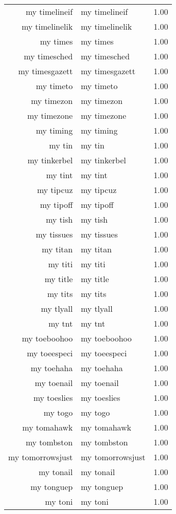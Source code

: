 \begin{table}[ht]
\begin{tabular}{rlr}
  my timelineif & my timelineif & 1.00 \\ 
  my timelinelik & my timelinelik & 1.00 \\ 
  my times & my times & 1.00 \\ 
  my timesched & my timesched & 1.00 \\ 
  my timesgazett & my timesgazett & 1.00 \\ 
  my timeto & my timeto & 1.00 \\ 
  my timezon & my timezon & 1.00 \\ 
  my timezone & my timezone & 1.00 \\ 
  my timing & my timing & 1.00 \\ 
  my tin & my tin & 1.00 \\ 
  my tinkerbel & my tinkerbel & 1.00 \\ 
  my tint & my tint & 1.00 \\ 
  my tipcuz & my tipcuz & 1.00 \\ 
  my tipoff & my tipoff & 1.00 \\ 
  my tish & my tish & 1.00 \\ 
  my tissues & my tissues & 1.00 \\ 
  my titan & my titan & 1.00 \\ 
  my titi & my titi & 1.00 \\ 
  my title & my title & 1.00 \\ 
  my tits & my tits & 1.00 \\ 
  my tlyall & my tlyall & 1.00 \\ 
  my tnt & my tnt & 1.00 \\ 
  my toeboohoo & my toeboohoo & 1.00 \\ 
  my toeespeci & my toeespeci & 1.00 \\ 
  my toehaha & my toehaha & 1.00 \\ 
  my toenail & my toenail & 1.00 \\ 
  my toeslies & my toeslies & 1.00 \\ 
  my togo & my togo & 1.00 \\ 
  my tomahawk & my tomahawk & 1.00 \\ 
  my tombston & my tombston & 1.00 \\ 
  my tomorrowsjust & my tomorrowsjust & 1.00 \\ 
  my tonail & my tonail & 1.00 \\ 
  my tonguep & my tonguep & 1.00 \\ 
  my toni & my toni & 1.00 \\ 

\end{tabular}
\end{table}
